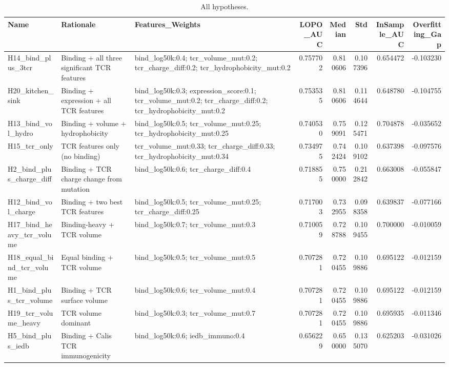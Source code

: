 \begin{table}
\caption{All hypotheses.}
\label{tab:supp_hyp}
\begin{tabular}{lllrrrrr}
\toprule
Name & Rationale & Features\_Weights & LOPO\_AUC & Median & Std & InSample\_AUC & Overfitting\_Gap \\
\midrule
H14\_bind\_plus\_3tcr & Binding + all three significant TCR features & bind\_log50k:0.4; tcr\_volume\_mut:0.2; tcr\_charge\_diff:0.2; tcr\_hydrophobicity\_mut:0.2 & 0.757702 & 0.810606 & 0.107396 & 0.654472 & -0.103230 \\
H20\_kitchen\_sink & Binding + expression + all TCR features & bind\_log50k:0.3; expression\_score:0.1; tcr\_volume\_mut:0.2; tcr\_charge\_diff:0.2; tcr\_hydrophobicity\_mut:0.2 & 0.753535 & 0.810606 & 0.114644 & 0.648780 & -0.104755 \\
H13\_bind\_vol\_hydro & Binding + volume + hydrophobicity & bind\_log50k:0.5; tcr\_volume\_mut:0.25; tcr\_hydrophobicity\_mut:0.25 & 0.740530 & 0.759091 & 0.125471 & 0.704878 & -0.035652 \\
H15\_tcr\_only & TCR features only (no binding) & tcr\_volume\_mut:0.33; tcr\_charge\_diff:0.33; tcr\_hydrophobicity\_mut:0.34 & 0.734975 & 0.742424 & 0.109102 & 0.637398 & -0.097576 \\
H2\_bind\_plus\_charge\_diff & Binding + TCR charge change from mutation & bind\_log50k:0.6; tcr\_charge\_diff:0.4 & 0.718855 & 0.750000 & 0.212842 & 0.663008 & -0.055847 \\
H12\_bind\_vol\_charge & Binding + two best TCR features & bind\_log50k:0.5; tcr\_volume\_mut:0.25; tcr\_charge\_diff:0.25 & 0.717003 & 0.732955 & 0.098358 & 0.639837 & -0.077166 \\
H17\_bind\_heavy\_tcr\_volume & Binding-heavy + TCR volume & bind\_log50k:0.7; tcr\_volume\_mut:0.3 & 0.710059 & 0.728788 & 0.109455 & 0.700000 & -0.010059 \\
H18\_equal\_bind\_tcr\_volume & Equal binding + TCR volume & bind\_log50k:0.5; tcr\_volume\_mut:0.5 & 0.707281 & 0.720455 & 0.109886 & 0.695122 & -0.012159 \\
H1\_bind\_plus\_tcr\_volume & Binding + TCR surface volume & bind\_log50k:0.6; tcr\_volume\_mut:0.4 & 0.707281 & 0.720455 & 0.109886 & 0.695122 & -0.012159 \\
H19\_tcr\_volume\_heavy & TCR volume dominant & bind\_log50k:0.3; tcr\_volume\_mut:0.7 & 0.707281 & 0.720455 & 0.109886 & 0.695935 & -0.011346 \\
H5\_bind\_plus\_iedb & Binding + Calis TCR immunogenicity & bind\_log50k:0.6; iedb\_immuno:0.4 & 0.656229 & 0.650000 & 0.135070 & 0.625203 & -0.031026 \\

\end{tabular}
\end{table}
